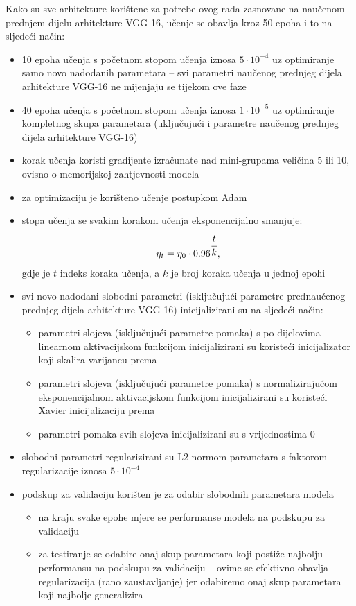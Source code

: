 \documentclass[times, utf8, diplomski, numeric]{fer}
\begin{document}
Kako su sve arhitekture korištene za potrebe ovog rada zasnovane na naučenom prednjem dijelu arhitekture VGG-16, učenje se obavlja kroz 50 epoha i to na sljedeći način:
\begin{itemize}
 \item 10 epoha učenja s početnom stopom učenja iznosa $5\cdot10^{-4}$ uz optimiranje samo novo nadodanih parametara -- svi parametri naučenog prednjeg dijela arhitekture VGG-16 ne mijenjaju se tijekom ove faze
 \item 40 epoha učenja s početnom stopom učenja iznosa $1\cdot10^{-5}$ uz optimiranje kompletnog skupa parametara (uključujući i parametre naučenog prednjeg dijela arhitekture VGG-16)
 \item korak učenja koristi gradijente izračunate nad mini-grupama veličina 5 ili 10, ovisno o memorijskoj zahtjevnosti modela
 \item za optimizaciju je korišteno učenje postupkom Adam
 \item stopa učenja se svakim korakom učenja eksponencijalno smanjuje:
 \begin{align}
  \eta_{t}=\eta_0 \cdot 0.96^{\cfrac{t}{k}},
 \end{align}
gdje je $t$ indeks koraka učenja, a $k$ je broj koraka učenja u jednoj epohi
 \item svi novo nadodani slobodni parametri (isključujući parametre prednaučenog prednjeg dijela arhitekture VGG-16) inicijalizirani su na sljedeći način:
 \begin{itemize}
  \item parametri slojeva (isključujući parametre pomaka) s po dijelovima linearnom aktivacijskom funkcijom inicijalizirani su koristeći inicijalizator koji skalira varijancu prema \citep{article:delving_deep_into_rectifiers}
  \item parametri slojeva (isključujući parametre pomaka) s normalizirajućom eksponencijalnom aktivacijskom funkcijom inicijalizirani su koristeći Xavier inicijalizaciju prema \citep{article:delving_deep_into_rectifiers}
  \item parametri pomaka svih slojeva inicijalizirani su s vrijednostima 0
 \end{itemize}

 \item slobodni parametri regularizirani su L2 normom parametara s faktorom regularizacije iznosa $5\cdot10^{-4}$
 \item podskup za validaciju korišten je za odabir slobodnih parametara modela
 \begin{itemize}
  \item na kraju svake epohe mjere se performanse modela na podskupu za validaciju
  \item za testiranje se odabire onaj skup parametara koji postiže najbolju performansu na podskupu za validaciju -- ovime se efektivno obavlja regularizacija (rano zaustavljanje) jer odabiremo onaj skup parametara koji najbolje generalizira
 \end{itemize}
\end{itemize}
\end{document}

